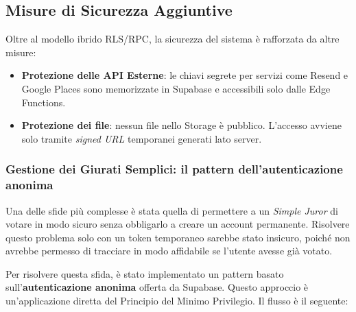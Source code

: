 \subsection{Misure di Sicurezza Aggiuntive}\label{subsec:misure-di-sicurezza-aggiuntive}
Oltre al modello ibrido RLS/RPC, la sicurezza del sistema è rafforzata da altre misure:
\begin{itemize}
	\item \textbf{Protezione delle API Esterne}: le chiavi segrete per servizi come Resend e Google Places sono memorizzate in Supabase e accessibili solo dalle Edge Functions.
	\item \textbf{Protezione dei file}: nessun file nello Storage è pubblico.
	L'accesso avviene solo tramite \emph{signed URL} temporanei generati lato server.
\end{itemize}

\subsubsection{Gestione dei Giurati Semplici: il pattern dell'autenticazione anonima}
Una delle sfide più complesse è stata quella di permettere a un \emph{Simple Juror} di votare in modo sicuro senza obbligarlo a creare un account permanente.
Risolvere questo problema solo con un token temporaneo sarebbe stato insicuro, poiché non avrebbe permesso di tracciare in modo affidabile se l'utente avesse già votato.

Per risolvere questa sfida, è stato implementato un pattern basato sull'\textbf{autenticazione anonima} offerta da Supabase.
Questo approccio è un'applicazione diretta del Principio del Minimo Privilegio.
Il flusso è il seguente:

